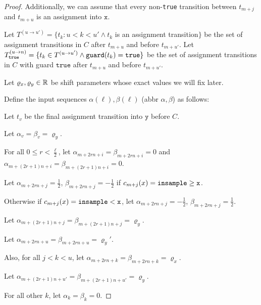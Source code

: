 \begin{proof}
	Additionally, we can assume that every non-\texttt{true} transition between $t_{m+j}$ and $t_{m+u}$ is an assignment into $\texttt{x}$. 

	Let $T^{(u\to u')} = \{t_k: u<k<u'\land t_k$ is an assignment transition$ \}$ be the set of assignment transitions in $C$ after $t_{m+u}$ and before $t_{m+u'}$. Let $T^{(u\to n)}_\texttt{true} = \{t_k\in T^{(u\to u')} \land \guard(t_k) = \texttt{true} \}$ be the set of assignment transitions in $C$ with guard $\texttt{true}$ after $t_{m+u}$ and before $t_{m+u'}$.

	Let $\varrho_x, \varrho_y \in \RR$ be shift parameters whose exact values we will fix later. 

	Define the input sequences $\alpha(\ell), \beta(\ell)$ (abbr $\alpha, \beta$) as follows: 

	Let $t_v$ be the final assignment transition into $\texttt{y}$ before $C$. 

	Let $\alpha_v = \beta_v = \varrho_y$. 

	For all $0\leq r < \frac{\ell}{2}$, let $\alpha_{m+2rn+i} = \beta_{m+2rn+i} =0$ and $\alpha_{m+(2r+1)n+i} = \beta_{m+(2r+1)n+i} = 0$.
	
	Let $\alpha_{m+2rn+j} = \frac{1}{2}$, $\beta_{m+2rn+j} = -\frac{1}{2}$ if $c_{m+j}(x) = \gguard[\texttt{x}]$.
	
	Otherwise if $c_{m+j}(x)=\lguard[\texttt{x}]$, let $\alpha_{m+2rn+j}=-\frac{1}{2}$, $\beta_{m+2rn+j} =\frac{1}{2}$.

	Let $\alpha_{m+(2r+1)n+j} = \beta_{m+(2r+1)n+j}=\varrho_y$.

	Let $\alpha_{m+2rn+u} = \beta_{m+2rn+u} = \varrho_y'$.

	Also, for all $j<k<u$, let $\alpha_{m+2rn+k}=\beta_{m+2rn+k} = \varrho_x$.

	Let $\alpha_{m+(2r+1)n+u'} = \beta_{m+(2r+1)n+u'} = \varrho_y$.
		
	For all other $k$, let $\alpha_k=\beta_k=0$. 


\end{proof}

